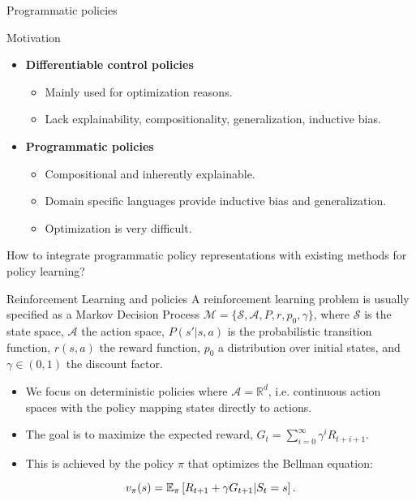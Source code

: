 \begin{frame}{Programmatic policies}
\end{frame}
\begin{frame}{Motivation}

\begin{itemize}
    \item \textbf{Differentiable control policies}
    \begin{itemize}
        \item Mainly used for optimization reasons.
        \item Lack explainability, compositionality, generalization, inductive bias.
    \end{itemize}
    \item \textbf{Programmatic policies}
    \begin{itemize}
        \item Compositional and inherently explainable.
        \item Domain specific languages provide inductive bias and generalization.
        \item Optimization is very difficult.
    \end{itemize}
\end{itemize}

How to integrate programmatic policy representations with existing methods for policy learning?


\end{frame}

\begin{frame}{Reinforcement Learning and policies}
    A reinforcement learning problem is usually specified as a Markov Decision Process $\mathcal{M} = \{\mathcal{S}, \mathcal{A}, P, r, p_0, \gamma\}$, where $\mathcal{S}$ is the state space, $\mathcal{A}$ the action space, $P(s'|s,a)$ is the probabilistic transition function, $r(s,a)$ the reward function, $p_0$ a distribution over initial states, and $\gamma \in (0,1)$ the discount factor. 
    \begin{itemize}
        \item We focus on deterministic policies where $\mathcal{A} = \mathbb{R}^d$, i.e. continuous action spaces with the policy mapping states directly to actions.
        \item The goal is to maximize the expected reward, $G_t = \sum_{i=0}^\infty \gamma^i R_{t+i+1}$. 
        \item This is achieved by the policy $\pi$ that optimizes the Bellman equation:
    \end{itemize}
    \begin{equation*}
        v_\pi(s) = \operatorname{\mathbb{E}}_\pi\left[R_{t+1} + \gamma G_{t+1} | S_t=s\right].
    \end{equation*}

\end{frame}

